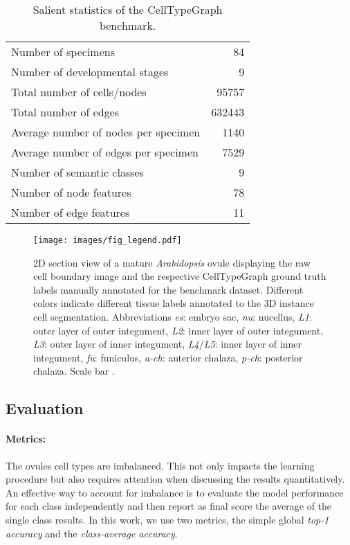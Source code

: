 \documentclass[10pt,twocolumn,letterpaper]{article}
\begin{document}
\begin{table}
  \centering
  \begin{tabular}{@{}lr@{}}
    \toprule
    Number of specimens & 84 \\
    Number of developmental stages & 9 \\
    Total number of cells/nodes & 95757\\
    Total number of edges & 632443 \\
    Average number of nodes per specimen & 1140 \\
    Average number of edges per specimen & 7529 \\
    Number of semantic classes & 9 \\
    Number of node features & 78\\
    Number of edge features & 11\\
    \bottomrule
  \end{tabular}
  \caption{Salient statistics of the CellTypeGraph benchmark.}
  \label{tab:summary}
\end{table}

\begin{figure}
    \centering
    \texttt{[image: images/fig\_legend.pdf]}
  \caption{2D section view of a mature \textit{Arabidopsis} ovule displaying the raw cell boundary image and the respective CellTypeGraph ground truth labels manually annotated for the benchmark dataset. Different colors indicate different tissue labels annotated to the 3D instance cell segmentation. Abbreviations \textit{es}: embryo sac, \textit{nu}: nucellus, \textit{L1}: outer layer of outer integument, \textit{L2}: inner layer of outer integument, \textit{L3}: outer layer of inner integument, \textit{L4}/\textit{L5}: inner layer of inner integument, \textit{fu}: funiculus, \textit{a-ch}: anterior chalaza, \textit{p-ch}: posterior chalaza. Scale bar .}
  \label{fig:labels-legend}
\end{figure}

\subsection{Evaluation}
\label{subsec:evaluation}
\paragraph{Metrics:} The ovules cell types are imbalanced. This not only impacts the learning procedure but also requires attention when discussing the results quantitatively.
An effective way to account for imbalance is to evaluate the model performance for each class independently and then report as final score the average of the single class results.
In this work, we use two metrics, the simple global \textit{top-1 accuracy} and the \textit{class-average accuracy}.
\end{document}
